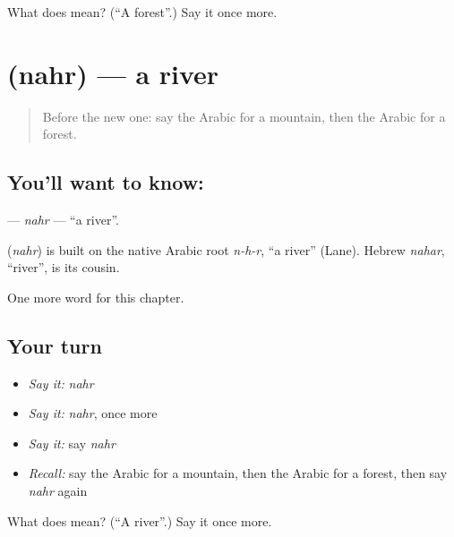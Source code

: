 \begin{tcolorbox}[breakable,colback=teal!4,colframe=teal!35!black,title={Before you move on}]
What does  mean? (\textquotedblleft{}A forest\textquotedblright{}.) Say it once more.
\end{tcolorbox}
\section[\texorpdfstring{\ar{نهر} (nahr)}{نهر (nahr)}]{ (nahr) — a river}

\label{lesson:AR-C76-nahr}



\begin{quote}
Before the new one: say the Arabic for a mountain, then the Arabic for a forest.
\end{quote}

\subsection*{You'll want to know: }
\textbf{} — \emph{nahr} — \textquotedblleft{}a river\textquotedblright{}.

\begin{cousinweb}
\textbf{} (\emph{nahr}) is built on the native Arabic root \emph{n-h-r}, \textquotedblleft{}a river\textquotedblright{} (Lane). Hebrew \emph{nahar}, \textquotedblleft{}river\textquotedblright{}, is its cousin.
\end{cousinweb}

\begin{grammarlens}[title={What you've built}]
One more word for this chapter.
\end{grammarlens}

\subsection*{Your turn}
\begin{itemize}
\raggedright
  \item \emph{Say it:} \emph{nahr}
  \item \emph{Say it:} \emph{nahr}, once more
  \item \emph{Say it:} say \emph{nahr}
  \item \emph{Recall:} say the Arabic for a mountain, then the Arabic for a forest, then say \emph{nahr} again
\end{itemize}

\begin{tcolorbox}[breakable,colback=teal!4,colframe=teal!35!black,title={Before you move on}]
What does  mean? (\textquotedblleft{}A river\textquotedblright{}.) Say it once more.
\end{tcolorbox}
